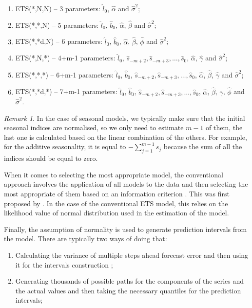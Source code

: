 \documentclass[]{book}
\providecommand{\tightlist}{%
  \setlength{\itemsep}{0pt}\setlength{\parskip}{0pt}}
\theoremstyle{definition}
\theoremstyle{definition}
\theoremstyle{definition}
\theoremstyle{definition}
\theoremstyle{remark}
\newtheorem*{remark}{Remark}
\begin{document}
\begin{enumerate}
\def\labelenumi{\arabic{enumi}.}
\tightlist
\item
  ETS(*,N,N) -- 3 parameters: \(\hat{l}_0\), \(\hat{\alpha}\) and \(\hat{\sigma}^2\);
\item
  ETS(*,*,N) -- 5 parameters: \(\hat{l}_0\), \(\hat{b}_0\), \(\hat{\alpha}\), \(\hat{\beta}\) and \(\hat{\sigma}^2\);
\item
  ETS(*,*d,N) -- 6 parameters: \(\hat{l}_0\), \(\hat{b}_0\), \(\hat{\alpha}\), \(\hat{\beta}\), \(\hat{\phi}\) and \(\hat{\sigma}^2\);
\item
  ETS(*,N,*) -- 4+m-1 parameters: \(\hat{l}_0\), \(\hat{s}_{-m+2}, \hat{s}_{-m+3}, \dots, \hat{s}_{0}\), \(\hat{\alpha}\), \(\hat{\gamma}\) and \(\hat{\sigma}^2\);
\item
  ETS(*,*,*) -- 6+m-1 parameters: \(\hat{l}_0\), \(\hat{b}_0\), \(\hat{s}_{-m+2}, \hat{s}_{-m+3}, \dots, \hat{s}_{0}\), \(\hat{\alpha}\), \(\hat{\beta}\), \(\hat{\gamma}\) and \(\hat{\sigma}^2\);
\item
  ETS(*,*d,*) -- 7+m-1 parameters: \(\hat{l}_0\), \(\hat{b}_0\), \(\hat{s}_{-m+2}, \hat{s}_{-m+3}, \dots, \hat{s}_{0}\), \(\hat{\alpha}\), \(\hat{\beta}\), \(\hat{\gamma}\), \(\hat{\phi}\) and \(\hat{\sigma}^2\).
\end{enumerate}

\begin{remark}
In the case of seasonal models, we typically make sure that the initial seasonal indices are normalised, so we only need to estimate \(m-1\) of them, the last one is calculated based on the linear combination of the others. For example, for the additive seasonality, it is equal to \(-\sum_{j=1}^{m-1} s_j\) because the sum of all the indices should be equal to zero.
\end{remark}

When it comes to selecting the most appropriate model, the conventional approach involves the application of all models to the data and then selecting the most appropriate of them based on an information criterion \citep[see Section 13.4 of][]{SvetunkovSBA}. This was first proposed by \citet{Hyndman2002}. In the case of the conventional ETS model, this relies on the likelihood value of normal distribution used in the estimation of the model.

Finally, the assumption of normality is used to generate prediction intervals from the model. There are typically two ways of doing that:

\begin{enumerate}
\def\labelenumi{\arabic{enumi}.}
\tightlist
\item
  Calculating the variance of multiple steps ahead forecast error and then using it for the intervals construction \citep[see Chapter 6 of][]{Hyndman2008b};
\item
  Generating thousands of possible paths for the components of the series and the actual values and then taking the necessary quantiles for the prediction intervals;
\end{enumerate}
\end{document}

